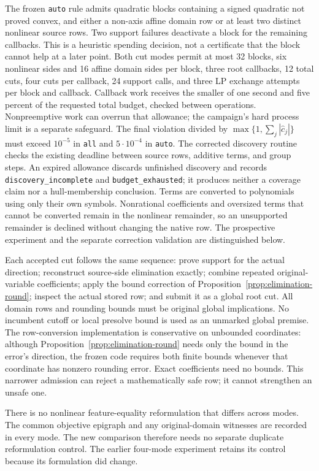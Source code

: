 The frozen \texttt{auto} rule admits quadratic blocks containing a signed
quadratic not proved convex, and either a non-axis affine domain row or
at least two distinct nonlinear source rows. Two support failures deactivate
a block for the remaining callbacks. This is a heuristic spending decision,
not a certificate that the block cannot help at a later point. Both cut
modes permit at most 32 blocks, six nonlinear sides and 16 affine domain
sides per block, three root callbacks, 12 total cuts, four cuts per
callback, 24 support calls, and three LP exchange attempts per block
and callback. Callback work receives the smaller of one second and five
percent of the requested total budget, checked between operations.
Nonpreemptive work can overrun that allowance; the campaign's hard process
limit is a separate safeguard. The final violation divided by
$\max\{1,\sum_j|\widehat c_j|\}$ must exceed $10^{-5}$ in
\texttt{all} and $5\cdot10^{-4}$ in \texttt{auto}.
The corrected discovery routine checks the existing deadline between
source rows, additive terms, and group steps. An expired allowance
discards unfinished discovery and records
\texttt{discovery\_incomplete} and \texttt{budget\_exhausted}; it
produces neither a coverage claim nor a hull-membership conclusion.
Terms are converted to polynomials using only their own symbols.
Nonrational coefficients and oversized terms that cannot be converted
remain in the nonlinear remainder, so an unsupported remainder is
declined without changing the native row. The prospective experiment
and the separate correction validation are distinguished below.

Each accepted cut follows the same sequence: prove support for the actual
direction; reconstruct source-side elimination exactly; combine repeated
original-variable coefficients; apply the bound correction of
Proposition~\ref{prop:elimination-round}; inspect the actual stored row;
and submit it as a global root cut. All domain rows and rounding bounds
must be original global implications. No incumbent cutoff or local
presolve bound is used as an unmarked global premise.
The row-conversion implementation is conservative on unbounded coordinates:
although Proposition~\ref{prop:elimination-round} needs only the bound
in the error's direction, the frozen code requires both finite bounds
whenever that coordinate has nonzero rounding error. Exact coefficients
need no bounds. This narrower admission can reject a mathematically safe
row; it cannot strengthen an unsafe one.

There is no nonlinear feature-equality reformulation that differs across
modes. The common objective epigraph and any original-domain witnesses
are recorded in every mode. The new comparison therefore needs no
separate duplicate reformulation control. The earlier four-mode experiment
retains its control because its formulation did change.

